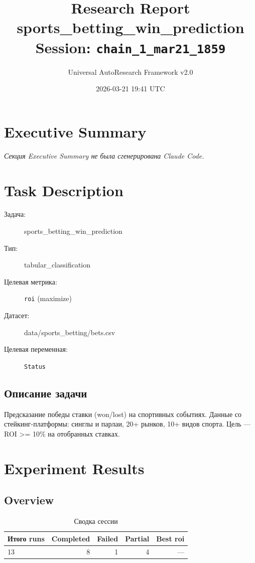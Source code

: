 \documentclass[10pt,a4paper,twocolumn]{article}
\title{
    \Large\textbf{Research Report}\\[0.5em]
    \large sports\_betting\_win\_prediction\\[0.3em]
    \normalsize Session: \texttt{chain\_1\_mar21\_1859}
}
\author{Universal AutoResearch Framework v2.0}
\date{2026-03-21 19:41 UTC}
\begin{document}
\maketitle
\tableofcontents
\newpage


\section{Executive Summary}

\textit{Секция Executive Summary не была сгенерирована Claude Code.}



\section{Task Description}

\begin{description}
    \item[Задача:] sports\_betting\_win\_prediction
    \item[Тип:] tabular\_classification
    \item[Целевая метрика:] \texttt{roi}
        (maximize)
    \item[Датасет:] data/sports\_betting/bets.csv
    \item[Целевая переменная:] \texttt{Status}
\end{description}

\subsection*{Описание задачи}
Предсказание победы ставки (won/lost) на спортивных событиях. Данные со стейкинг-платформы: синглы и парлаи, 20+ рынков, 10+ видов спорта. Цель — ROI >= 10\% на отобранных ставках.




\section{Experiment Results}

\subsection{Overview}

\begin{table}[H]
\centering
\caption{Сводка сессии}
\begin{tabular}{lrrrr}
\toprule
Итого runs & Completed & Failed & Partial & Best roi \\
\midrule
13 & \textcolor{passcolor}{8}
    & \textcolor{failcolor}{1}
    & \textcolor{partialcolor}{4}
    & --- \\
\bottomrule
\end{tabular}
\end{table}
\end{document}

